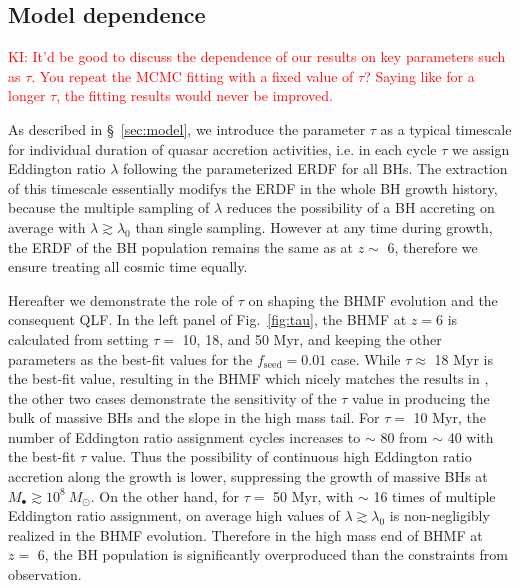 \documentclass[twocolumn, twocolappendix]{aastex63}
\newcommand{\Msun}{M_\odot}
\newcommand{\tlife}{\tau}
\newcommand{\fseed}{f_\mathrm{seed}}
\newcommand{\red}[1]{\textcolor{red}{ #1}}
\begin{document}
\begin{CJK*}{UTF8}{gbsn}
\vspace{2mm}
\subsection{Model dependence}\label{sec:modep}
\red{KI: It'd be good to discuss the dependence of our results on key parameters such as $\tlife$.
You repeat the MCMC fitting with a fixed value of $\tlife$? Saying like for a longer $\tlife$,
the fitting results would never be improved.}

As described in \S~\ref{sec:model}, we introduce the parameter $\tau$ as a typical timescale 
for individual duration of quasar accretion activities, i.e. in each cycle $\tlife$ 
we assign Eddington ratio $\lambda$ following the parameterized ERDF for all BHs.
The extraction of this timescale essentially modifys the ERDF in the whole BH growth history, 
because the multiple sampling of $\lambda$ reduces the possibility of a BH accreting on average with $\lambda \gtrsim \lambda_0$ 
than single sampling. 
However at any time during growth, the ERDF of the BH population remains the same as at $z\sim$ 6, 
therefore we ensure treating all cosmic time equally. 


Hereafter we demonstrate the role of $\tlife$ on shaping the BHMF evolution and the consequent QLF. 
In the left panel of Fig.~\ref{fig:tau}, the BHMF at $z=6$ is calculated from setting $\tlife=$ 10, 18, and 50 Myr, 
and keeping the other parameters as the best-fit values for the $\fseed=0.01$ case.
While $\tlife \approx$ 18 Myr is the best-fit value, resulting in the BHMF which nicely matches the results in , 
the other two cases demonstrate the sensitivity of the $\tlife$ value in producing the bulk of massive BHs 
and the slope in the high mass tail. 
For $\tlife=$ 10 Myr, the number of Eddington ratio assignment cycles increases to $\sim$ 80 
from $\sim$ 40 with the best-fit $\tlife$ value. 
Thus the possibility of continuous high Eddington ratio accretion along the growth is lower, 
suppressing the growth of massive BHs at $M_\bullet \gtrsim 10^8~\Msun$. 
On the other hand, for $\tlife=$ 50 Myr, with $\sim$ 16 times of multiple Eddington ratio assignment,
on average high values of $\lambda\gtrsim \lambda_0$ is non-negligibly realized in the BHMF evolution. 
Therefore in the high mass end of BHMF at $z=$ 6, the BH population is significantly overproduced than the constraints from observation.


\end{CJK*}
\end{document}
